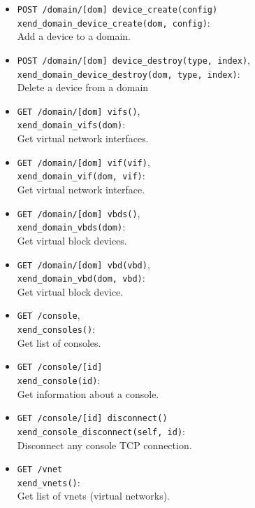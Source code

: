 \documentclass[11pt,twoside,final,openright]{report}
\begin{document}
\begin{itemize}
\item {\tt POST /domain/[dom] device\_create(config)}\\
  {\tt xend\_domain\_device\_create(dom, config)}:\\
  Add a device to a domain.

\item {\tt POST /domain/[dom] device\_destroy(type, index)},\\
  {\tt xend\_domain\_device\_destroy(dom, type, index)}:\\
  Delete a device from a domain

\item {\tt GET /domain/[dom] vifs()},\\
  {\tt xend\_domain\_vifs(dom)}:\\
  Get virtual network interfaces.

\item {\tt GET /domain/[dom] vif(vif)},\\
  {\tt xend\_domain\_vif(dom, vif)}:\\
  Get virtual network interface.

\item {\tt GET /domain/[dom] vbds()},\\
  {\tt xend\_domain\_vbds(dom)}:\\
  Get virtual block devices.

\item {\tt GET /domain/[dom] vbd(vbd)},\\
  {\tt xend\_domain\_vbd(dom, vbd)}:\\
  Get virtual block device.

\item {\tt GET /console},\\
  {\tt xend\_consoles()}:\\
  Get list of consoles.

\item {\tt GET /console/[id]}\\
  {\tt xend\_console(id)}:\\
  Get information about a console.

\item {\tt GET /console/[id] disconnect()}\\
  {\tt xend\_console\_disconnect(self, id)}:\\
  Disconnect any console TCP connection.

\item {\tt GET /vnet}\\
  {\tt xend\_vnets()}:\\
  Get list of vnets (virtual networks).


\end{itemize}
\end{document}
